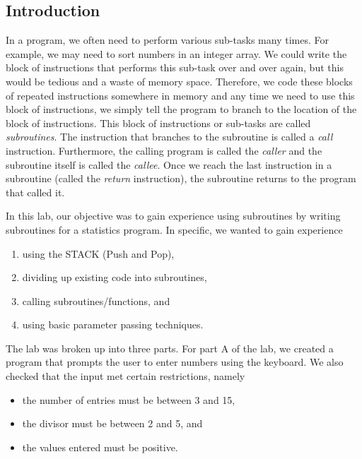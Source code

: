 \documentclass[10pt, letterpaper, titlepage]{article} %
\title{\textbf{\Huge{
\begin{center}
Introduction to\\ Subroutines \\
\end{center}
}}}
\author{Benjamin Kong | 1573684\\Lora Ma ||||| 1570935\\ \\ECE 212 Lab Section H11}
\begin{document}
 
\maketitle 
\thispagestyle{empty}
\tableofcontents 
\newpage
{}

\begin{multicols*}{2}


\section{Introduction}
In a program, we often need to perform various sub-tasks many times. 
For example, we may need to sort numbers in an integer array. 
We could write the block of instructions that performs this sub-task over and over again, but this would be tedious and a waste of memory space. 
Therefore, we code these blocks of repeated instructions somewhere in memory and any time we need to use this block of instructions, we simply tell the program to branch to the location of the block of instructions. 
This block of instructions or sub-tasks are called \textit{subroutines}. 
The instruction that branches to the subroutine is called a \textit{call} instruction. 
Furthermore, the calling program is called the \textit{caller} and the subroutine itself is called the \textit{callee}. 
Once we reach the last instruction in a subroutine (called the \textit{return} instruction), the subroutine returns to the program that called it. 

In this lab, our objective was to gain experience using subroutines by writing subroutines for a statistics program. 
In specific, we wanted to gain experience
\begin{enumerate}
\item using the STACK (Push and Pop),
\item dividing up existing code into subroutines,
\item calling subroutines/functions, and
\item using basic parameter passing techniques.
\end{enumerate}
The lab was broken up into three parts. 
For part A of the lab, we created a program that prompts the user to enter numbers using the keyboard. 
We also checked that the input met certain restrictions, namely
\begin{itemize}
\item the number of entries must be between 3 and 15,
\item the divisor must be between 2 and 5, and
\item the values entered must be positive.
\end{itemize}


\end{multicols*}
\end{document}
